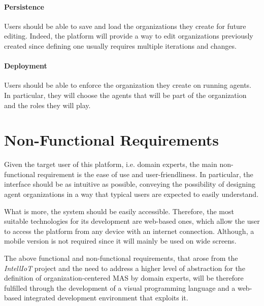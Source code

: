\paragraph{Persistence}{
    Users should be able to save and load the organizations they create for future editing.
    Indeed, the platform will provide a way to edit organizations previously created since defining one usually requires multiple iterations and changes.
}

\paragraph{Deployment}{
    Users should be able to enforce the organization they create on running agents.
    In particular, they will choose the agents that will be part of the organization and the roles they will play.
}

\section{Non-Functional Requirements}
Given the target user of this platform, i.e. domain experts, the main non-functional requirement is the ease of use and user-friendliness.
In particular, the interface should be as intuitive as possible, conveying the possibility of designing agent organizations in a way that typical users are expected to easily understand.

What is more, the system should be easily accessible.
Therefore, the most suitable technologies for its development are web-based ones, which allow the user to access the platform from any device with an internet connection.
Although, a mobile version is not required since it will mainly be used on wide screens.

The above functional and non-functional requirements, that arose from the \textit{IntellIoT} project and the need to address a higher level of abstraction for the definition of organization-centered MAS by domain experts, will be therefore fulfilled through the development of a visual programming language and a web-based integrated development environment that exploits it.